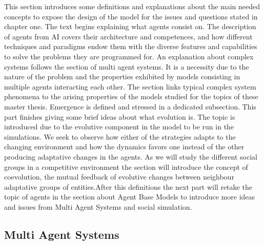 \documentclass[11pt,oneside,a4paper,openright]{report}
\begin{document}
This section introduces some definitions and explanations about the main needed concepts to expose the design of the model for the issues and questions stated in chapter one. The text begins explaining what agents consist on. The description of agents from AI covers their architecture and competences, and how different techniques and paradigms endow them with the diverse features and capabilities to solve the problems they are programmed for. An explanation about complex systems follows the section of multi agent systems. It is a necessity due to the nature of the problem and the properties exhibited by models consisting in multiple agents interacting each other. The section links typical complex system phenomena to the arising properties of the models studied for the topics of these master thesis. Emergence is defined and stressed in a dedicated subsection. This part finishes giving some brief ideas about what evolution is. The topic is introduced due to the evolutive component in the model to be run in the simulations. We seek to observe how either of the strategies adapts to the changing environment and how the dynamics favors one instead of the other producing adaptative changes in the agents. As we will study the different social groups in a competitive environment the section will introduce the concept of coevolution, the mutual feedback of evolutive changes between neighbour adaptative groups of entities.After this definitions the next part will retake the topic of agents in the section about Agent Base Models to introduce more ideas and issues from Multi Agent Systems and social simulation.   


\subsection{Multi Agent Systems} %


\end{document}
